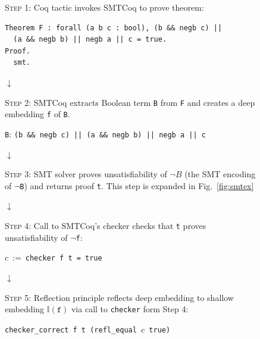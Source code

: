 \documentclass{article}
\begin{document}
	\begin{figure}
		\vspace{-1.3in}
		\begin{framed}
			\textsc{Step 1}: Coq tactic invokes SMTCoq
			to prove theorem:
			\begin{verbatim}
Theorem F : forall (a b c : bool), (b && negb c) || 
  (a && negb b) || negb a || c = true.
Proof.
  smt.
			\end{verbatim}
		\end{framed}
		
		\begin{center}
			$\downarrow$
		\end{center}
	
		\begin{framed}
			\textsc{Step 2}: SMTCoq extracts Boolean 
			term \texttt{B} from \texttt{F} and creates a deep 
			embedding \texttt{f} of \texttt{B}.
			\begin{center}
				\texttt{B}: \texttt{(b \&\& negb c) || 
				(a \&\& negb b) || negb a || c}
			\end{center}
		\end{framed}
		
		\begin{center}
			$\downarrow$
		\end{center}
	
		\begin{framed}
			\textsc{Step 3}: SMT solver 
			proves unsatisfiability of $\neg B$ 
			(the SMT encoding of $\neg$\texttt{B}) 
			and returns proof \texttt{t}. This step 
			is expanded in Fig.~\ref{fig:smtex}
		\end{framed}
		
		\begin{center}
			$\downarrow$
		\end{center}
		
		\begin{framed}
			\textsc{Step 4}: Call to SMTCoq's 
			checker checks that \texttt{t}
			proves unsatisfiability of 
			\texttt{$\neg$f}:
			\begin{center}
				$c\ :=\ $\texttt{checker f t = true}
			\end{center}
		\end{framed}
		
		\begin{center}
			$\downarrow$
		\end{center}
		
		\begin{framed}
			\textsc{Step 5}: Reflection principle 
			reflects deep embedding to shallow 
			embedding $\mathbb{I}(\texttt{f})$
			via call to \texttt{checker} form 
			Step 4:
			\begin{center}
				\texttt{checker\_correct f t 
					(refl\_equal $c$ true)}
			\end{center}
		\end{framed}
		

\end{figure}
\end{document}
